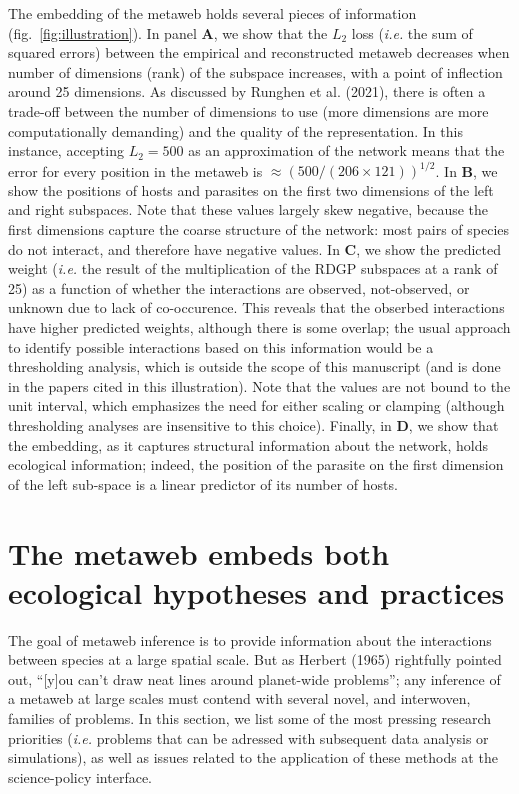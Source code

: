 \documentclass[10pt,oneside]{article}
\begin{document}
The embedding of the metaweb holds several pieces of information
(fig.~\ref{fig:illustration}). In panel \textbf{A}, we show that the
\(L_2\) loss (\emph{i.e.} the sum of squared errors) between the
empirical and reconstructed metaweb decreases when number of dimensions
(rank) of the subspace increases, with a point of inflection around 25
dimensions. As discussed by Runghen et al. (2021), there is often a
trade-off between the number of dimensions to use (more dimensions are
more computationally demanding) and the quality of the representation.
In this instance, accepting \(L_2 = 500\) as an approximation of the
network means that the error for every position in the metaweb is
\(\approx \left(500/(206\times 121)\right)^{1/2}\). In \textbf{B}, we
show the positions of hosts and parasites on the first two dimensions of
the left and right subspaces. Note that these values largely skew
negative, because the first dimensions capture the coarse structure of
the network: most pairs of species do not interact, and therefore have
negative values. In \textbf{C}, we show the predicted weight
(\emph{i.e.} the result of the multiplication of the RDGP subspaces at a
rank of 25) as a function of whether the interactions are observed,
not-observed, or unknown due to lack of co-occurence. This reveals that
the obserbed interactions have higher predicted weights, although there
is some overlap; the usual approach to identify possible interactions
based on this information would be a thresholding analysis, which is
outside the scope of this manuscript (and is done in the papers cited in
this illustration). Note that the values are not bound to the unit
interval, which emphasizes the need for either scaling or clamping
(although thresholding analyses are insensitive to this choice).
Finally, in \textbf{D}, we show that the embedding, as it captures
structural information about the network, holds ecological information;
indeed, the position of the parasite on the first dimension of the left
sub-space is a linear predictor of its number of hosts.

\hypertarget{the-metaweb-embeds-both-ecological-hypotheses-and-practices}{%
\section{The metaweb embeds both ecological hypotheses and
practices}\label{the-metaweb-embeds-both-ecological-hypotheses-and-practices}}

The goal of metaweb inference is to provide information about the
interactions between species at a large spatial scale. But as Herbert
(1965) rightfully pointed out, ``{[}y{]}ou can't draw neat lines around
planet-wide problems''; any inference of a metaweb at large scales must
contend with several novel, and interwoven, families of problems. In
this section, we list some of the most pressing research priorities
(\emph{i.e.} problems that can be adressed with subsequent data analysis
or simulations), as well as issues related to the application of these
methods at the science-policy interface.
\end{document}
